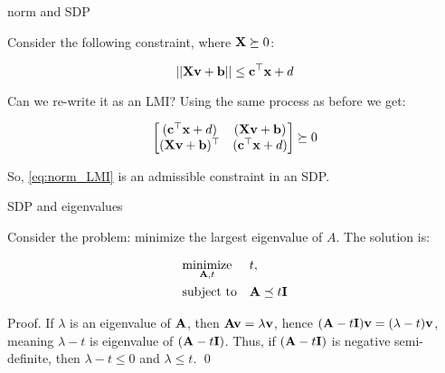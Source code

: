 \documentclass{beamer}
\begin{document}
\begin{frame}{norm and SDP}
	\begin{flushleft}
		
		Consider the following constraint, where $\mathbf{X} \succeq 0$:
		
		\begin{equation}
			\label{eq:norm_LMI}
			||\mathbf{X}\mathbf{v} + \mathbf{b}|| \leq \mathbf{c}^\top \mathbf{x} + d
		\end{equation}
		
		Can we re-write it as an LMI? Using the same process as before we get:
		
		\begin{align}
			\begin{bmatrix}
	(\mathbf{c}^\top \mathbf{x} + d) & (\mathbf{X}\mathbf{v} + \mathbf{b}) \\
	(\mathbf{X}\mathbf{v} + \mathbf{b})^\top & (\mathbf{c}^\top \mathbf{x} + d)
		\end{bmatrix} \succeq 0
		\end{align}
	
		So, \eqref{eq:norm_LMI} is an admissible constraint in an SDP.
		
	\end{flushleft}
\end{frame}






\begin{frame}{SDP and eigenvalues}
	\begin{flushleft}
		
		Consider the problem: minimize the largest eigenvalue of $A$. The solution is:
		
		\begin{equation}
			\begin{aligned}
				& \underset{\mathbf{A}, t}{\text{minimize}}
				& & t, \\
				& \text{subject to}
				& & \mathbf{A} \preceq t\mathbf{I}
			\end{aligned}
		\end{equation}
		
		Proof. If $\lambda$ is an eigenvalue of $\mathbf{A}$, then $\mathbf{A} \mathbf{v} = \lambda\mathbf{v}$, hence $(\mathbf{A} - t\mathbf{I}) \mathbf{v} = (\lambda - t)\mathbf{v}$, meaning $\lambda - t$ is eigenvalue of $(\mathbf{A} - t\mathbf{I})$. Thus, if $(\mathbf{A} - t\mathbf{I})$ is negative semi-definite, then $\lambda - t \leq 0$ and $\lambda \leq t$. \qed
		
		
	\end{flushleft}
\end{frame}
\end{document}
